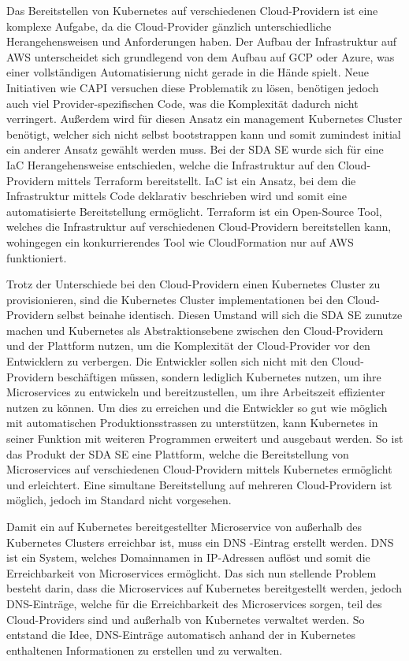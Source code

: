 Das Bereitstellen von Kubernetes auf verschiedenen Cloud-Providern ist eine komplexe Aufgabe, da die Cloud-Provider gänzlich unterschiedliche Herangehensweisen und Anforderungen haben.
Der Aufbau der Infrastruktur auf AWS unterscheidet sich grundlegend von dem Aufbau auf GCP oder Azure, was einer vollständigen Automatisierung nicht gerade in die Hände spielt.
Neue Initiativen wie \ac{CAPI} versuchen diese Problematik zu lösen, benötigen jedoch auch viel Provider-spezifischen Code, was die Komplexität dadurch nicht verringert.
Außerdem wird für diesen Ansatz ein management Kubernetes Cluster benötigt, welcher sich nicht selbst bootstrappen kann und somit zumindest initial ein anderer Ansatz gewählt werden muss.
Bei der SDA SE wurde sich für eine \ac{IaC} Herangehensweise entschieden, welche die Infrastruktur auf den Cloud-Providern mittels Terraform bereitstellt.
IaC ist ein Ansatz, bei dem die Infrastruktur mittels Code deklarativ beschrieben wird und somit eine automatisierte Bereitstellung ermöglicht.
Terraform ist ein Open-Source Tool, welches die Infrastruktur auf verschiedenen Cloud-Providern bereitstellen kann, wohingegen ein konkurrierendes Tool wie CloudFormation nur auf AWS funktioniert.
\medskip

Trotz der Unterschiede bei den Cloud-Providern einen Kubernetes Cluster zu provisionieren, sind die Kubernetes Cluster implementationen bei den Cloud-Providern selbst beinahe identisch.
Diesen Umstand will sich die SDA SE zunutze machen und Kubernetes als Abstraktionsebene zwischen den Cloud-Providern und der Plattform nutzen, um die Komplexität der Cloud-Provider vor den Entwicklern zu verbergen.
Die Entwickler sollen sich nicht mit den Cloud-Providern beschäftigen müssen, sondern lediglich Kubernetes nutzen, um ihre Microservices zu entwickeln und bereitzustellen, um ihre Arbeitszeit effizienter nutzen zu können.
Um dies zu erreichen und die Entwickler so gut wie möglich mit automatischen Produktionsstrassen zu unterstützen, kann Kubernetes in seiner Funktion mit weiteren Programmen erweitert und ausgebaut werden.
So ist das Produkt der SDA SE eine Plattform, welche die Bereitstellung von Microservices auf verschiedenen Cloud-Providern mittels Kubernetes ermöglicht und erleichtert.
Eine simultane Bereitstellung auf mehreren Cloud-Providern ist möglich, jedoch im Standard nicht vorgesehen.
\medskip

Damit ein auf Kubernetes bereitgestellter Microservice von außerhalb des Kubernetes Clusters erreichbar ist, muss ein \ac{DNS} -Eintrag erstellt werden.
DNS ist ein System, welches Domainnamen in IP-Adressen auflöst und somit die Erreichbarkeit von Microservices ermöglicht.
Das sich nun stellende Problem besteht darin, dass die Microservices auf Kubernetes bereitgestellt werden, jedoch DNS-Einträge, welche für die Erreichbarkeit des Microservices sorgen, teil des Cloud-Providers sind und außerhalb von Kubernetes verwaltet werden.
So entstand die Idee, DNS-Einträge automatisch anhand der in Kubernetes enthaltenen Informationen zu erstellen und zu verwalten.

